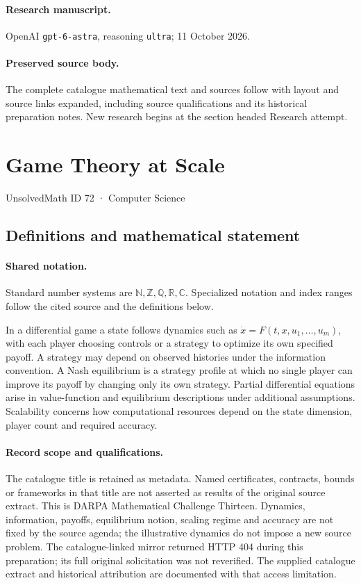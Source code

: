 \documentclass[11pt]{article}
\begin{document}
\paragraph{Research manuscript.} OpenAI \texttt{gpt-6-astra}, reasoning \texttt{ultra}; 11 October 2026.
\paragraph{Preserved source body.} The complete catalogue mathematical text and sources follow with layout and source links expanded, including source qualifications and its historical preparation notes. New research begins at the section headed Research attempt.

\section{Game Theory at Scale}\label{72}
{\small UnsolvedMath ID 72 · Computer Science}
\subsection{Definitions and mathematical statement}

\paragraph{Shared notation.}Standard number systems are $\mathbb N,\mathbb Z,\mathbb Q,\mathbb R,\mathbb C$. Specialized notation and index ranges follow the cited source and the definitions below.


In a differential game a state follows dynamics such as $\dot x=F(t,x,u_1,\ldots,u_m)$, with each player choosing controls or a strategy to optimize its own specified payoff. A strategy may depend on observed histories under the information convention. A Nash equilibrium is a strategy profile at which no single player can improve its payoff by changing only its own strategy. Partial differential equations arise in value-function and equilibrium descriptions under additional assumptions. Scalability concerns how computational resources depend on the state dimension, player count and required accuracy.
\paragraph{Record scope and qualifications.}
The catalogue title is retained as metadata. Named certificates, contracts, bounds or frameworks in that title are not asserted as results of the original source extract.
This is DARPA Mathematical Challenge Thirteen. Dynamics, information, payoffs, equilibrium notion, scaling regime and accuracy are not fixed by the source agenda; the illustrative dynamics do not impose a new source problem. The catalogue-linked mirror returned HTTP 404 during this preparation; its full original solicitation was not reverified. The supplied catalogue extract and historical attribution are documented with that access limitation.
\end{document}
